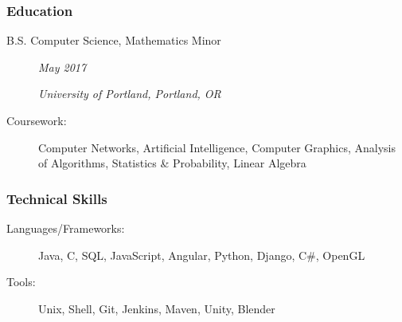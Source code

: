 \documentclass{article}
\begin{document}
\subsubsection*{Education}
    \begin{description}
        \item[B.S. Computer Science, Mathematics Minor]\hfill \textit{May 2017}

        \textit{University of Portland, Portland, OR}

        \vspace{0.5em}

        \item[Coursework:]
            Computer Networks, 
            Artificial Intelligence, 
            Computer Graphics, 
            Analysis of Algorithms,
            Statistics \& Probability,
            Linear Algebra
    \end{description}


\subsubsection*{Technical Skills}
    \begin{description}    
        \item[Languages/Frameworks:] 
            Java, 
            C, 
            SQL,
            JavaScript,
            Angular,
            Python,
            Django, 
            C\#,
            OpenGL

            \vspace{0.5em}

        \item[Tools:] 
            Unix,
            Shell,
            Git,
            Jenkins,
            Maven,
            Unity,
            Blender
    \end{description}
\end{document}
